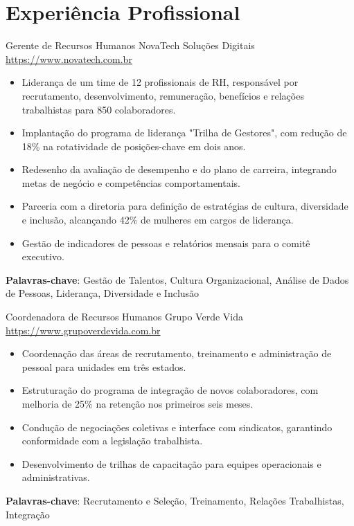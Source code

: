 \documentclass[a4paper, serif, 10pt]{moderncv}
\begin{document}
\section{Experiência Profissional}

        {Gerente de Recursos Humanos}
        {NovaTech Soluções Digitais}
        {\url{https://www.novatech.com.br}}
        {}
        {\begin{itemize}
\item Liderança de um time de 12 profissionais de RH, responsável por recrutamento, desenvolvimento, remuneração, benefícios e relações trabalhistas para 850 colaboradores.
\item Implantação do programa de liderança "Trilha de Gestores", com redução de 18\% na rotatividade de posições-chave em dois anos.
\item Redesenho da avaliação de desempenho e do plano de carreira, integrando metas de negócio e competências comportamentais.
\item Parceria com a diretoria para definição de estratégias de cultura, diversidade e inclusão, alcançando 42\% de mulheres em cargos de liderança.
\item Gestão de indicadores de pessoas e relatórios mensais para o comitê executivo.
\end{itemize}
\textbf{Palavras-chave}: Gestão de Talentos, Cultura Organizacional, Análise de Dados de Pessoas, Liderança, Diversidade e Inclusão}

        {Coordenadora de Recursos Humanos}
        {Grupo Verde Vida}
        {\url{https://www.grupoverdevida.com.br}}
        {}
        {\begin{itemize}
\item Coordenação das áreas de recrutamento, treinamento e administração de pessoal para unidades em três estados.
\item Estruturação do programa de integração de novos colaboradores, com melhoria de 25\% na retenção nos primeiros seis meses.
\item Condução de negociações coletivas e interface com sindicatos, garantindo conformidade com a legislação trabalhista.
\item Desenvolvimento de trilhas de capacitação para equipes operacionais e administrativas.
\end{itemize}
\textbf{Palavras-chave}: Recrutamento e Seleção, Treinamento, Relações Trabalhistas, Integração}
\end{document}

